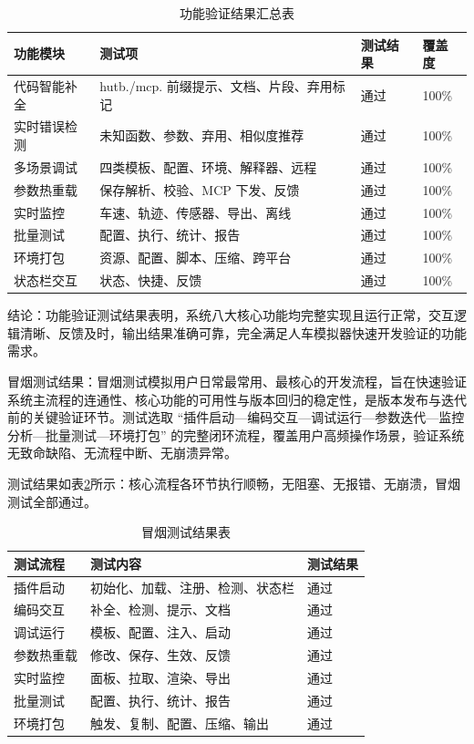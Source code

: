 \begin{table}[H]
\centering
\caption{功能验证结果汇总表}
\label{tab:5-5}
\scriptsize
\renewcommand{\arraystretch}{1.18}
\begin{tabularx}{\textwidth}{p{}Xp{}p{}}
\toprule
功能模块 & 测试项 & 测试结果 & 覆盖度 \\
\midrule
代码智能补全 & hutb./mcp. 前缀提示、文档、片段、弃用标记 & 通过 & 100\% \\
实时错误检测 & 未知函数、参数、弃用、相似度推荐 & 通过 & 100\% \\
多场景调试 & 四类模板、配置、环境、解释器、远程 & 通过 & 100\% \\
参数热重载 & 保存解析、校验、MCP 下发、反馈 & 通过 & 100\% \\
实时监控 & 车速、轨迹、传感器、导出、离线 & 通过 & 100\% \\
批量测试 & 配置、执行、统计、报告 & 通过 & 100\% \\
环境打包 & 资源、配置、脚本、压缩、跨平台 & 通过 & 100\% \\
状态栏交互 & 状态、快捷、反馈 & 通过 & 100\% \\
\bottomrule
\end{tabularx}
\end{table}



结论：功能验证测试结果表明，系统八大核心功能均完整实现且运行正常，交互逻辑清晰、反馈及时，输出结果准确可靠，完全满足人车模拟器快速开发验证的功能需求。

冒烟测试结果：冒烟测试模拟用户日常最常用、最核心的开发流程，旨在快速验证系统主流程的连通性、核心功能的可用性与版本回归的稳定性，是版本发布与迭代前的关键验证环节。测试选取
“插件启动—编码交互—调试运行—参数迭代—监控分析—批量测试—环境打包”
的完整闭环流程，覆盖用户高频操作场景，验证系统无致命缺陷、无流程中断、无崩溃异常。

测试结果如表\ref{tab:5-6}所示：核心流程各环节执行顺畅，无阻塞、无报错、无崩溃，冒烟测试全部通过。

\begin{table}[H]
\centering
\caption{冒烟测试结果表}
\label{tab:5-6}
\footnotesize
\renewcommand{\arraystretch}{1.18}
\begin{tabularx}{\textwidth}{p{}Xp{}}
\toprule
测试流程 & 测试内容 & 测试结果 \\
\midrule
插件启动 & 初始化、加载、注册、检测、状态栏 & 通过 \\
编码交互 & 补全、检测、提示、文档 & 通过 \\
调试运行 & 模板、配置、注入、启动 & 通过 \\
参数热重载 & 修改、保存、生效、反馈 & 通过 \\
实时监控 & 面板、拉取、渲染、导出 & 通过 \\
批量测试 & 配置、执行、统计、报告 & 通过 \\
环境打包 & 触发、复制、配置、压缩、输出 & 通过 \\
\bottomrule
\end{tabularx}
\end{table}



